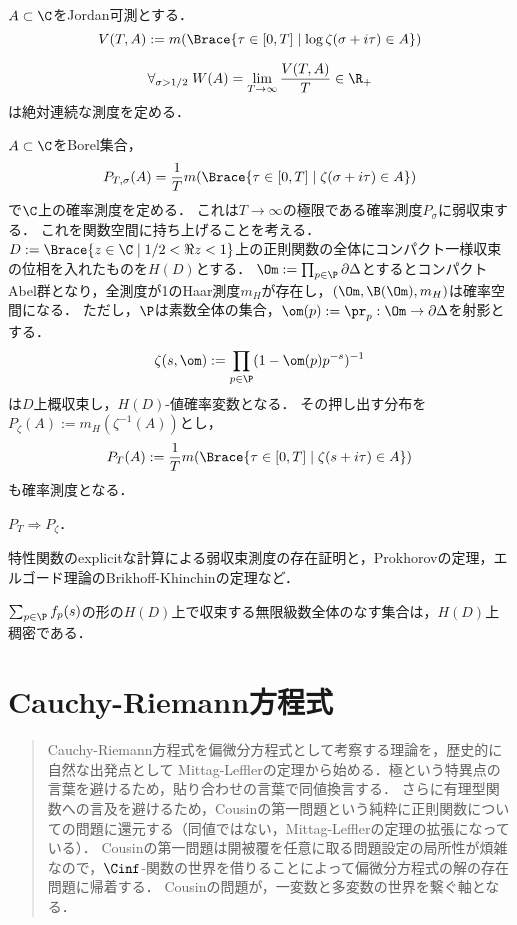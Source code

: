 \documentclass[uplatex, dvipdfmx]{jsreport}
\begin{document}
\begin{notation}
    $A\subset\C$をJordan可測とする．
    \[V(T,A):=m(\Brace{\tau\in[0,T]\mid\log\zeta(\sigma+i\tau)\in A})\]
\end{notation}

\begin{theorem}
    \[\forall_{\sigma>1/2}\;W(A)=\lim_{T\to\infty}\frac{V(T,A)}{T}\in\R_+\]
    は絶対連続な測度を定める．
\end{theorem}

\begin{notation}
    $A\subset\C$をBorel集合，
    \[P_{T,\sigma}(A)=\frac{1}{T}m(\Brace{\tau\in[0,T]\mid\zeta(\sigma+i\tau)\in A})\]
    で$\C$上の確率測度を定める．
    これは$T\to\infty$の極限である確率測度$P_\sigma$に弱収束する．
    これを関数空間に持ち上げることを考える．
    $D:=\Brace{z\in\C\mid1/2<\Re z<1}$上の正則関数の全体にコンパクト一様収束の位相を入れたものを$H(D)$とする．
    $\Om:=\prod_{p\in\P}\partial\Delta$とするとコンパクトAbel群となり，全測度が1のHaar測度$m_H$が存在し，$(\Om,\B(\Om),m_H)$は確率空間になる．
    ただし，$\P$は素数全体の集合，$\om(p):=\pr_p:\Om\to\partial\Delta$を射影とする．
    \[\zeta(s,\om):=\prod_{p\in\P}(1-\om(p)p^{-s})^{-1}\]
    は$D$上概収束し，$H(D)$-値確率変数となる．
    その押し出す分布を$P_\zeta(A):=m_H(\zeta^{-1}(A))$とし，
    \[P_T(A):=\frac{1}{T}m(\Brace{\tau\in[0,T]\mid\zeta(s+i\tau)\in A})\]
    も確率測度となる．
\end{notation}

\begin{theorem}[Bagchi]
    $P_T\Rightarrow P_\zeta$．
\end{theorem}
\begin{Proof}
    特性関数のexplicitな計算による弱収束測度の存在証明と，Prokhorovの定理，エルゴード理論のBrikhoff-Khinchinの定理など．
\end{Proof}

\begin{lemma}
    $\sum_{p\in\P}f_p(s)$の形の$H(D)$上で収束する無限級数全体のなす集合は，$H(D)$上稠密である．
\end{lemma}

\chapter{Cauchy-Riemann方程式}

\begin{quotation}
    Cauchy-Riemann方程式を偏微分方程式として考察する理論を，歴史的に自然な出発点として
    Mittag-Lefflerの定理から始める．極という特異点の言葉を避けるため，貼り合わせの言葉で同値換言する．
    さらに有理型関数への言及を避けるため，Cousinの第一問題という純粋に正則関数についての問題に還元する（同値ではない，Mittag-Lefflerの定理の拡張になっている）．
    Cousinの第一問題は開被覆を任意に取る問題設定の局所性が煩雑なので，$\Cinf$-関数の世界を借りることによって偏微分方程式の解の存在問題に帰着する．
    Cousinの問題が，一変数と多変数の世界を繋ぐ軸となる．
\end{quotation}
\end{document}
